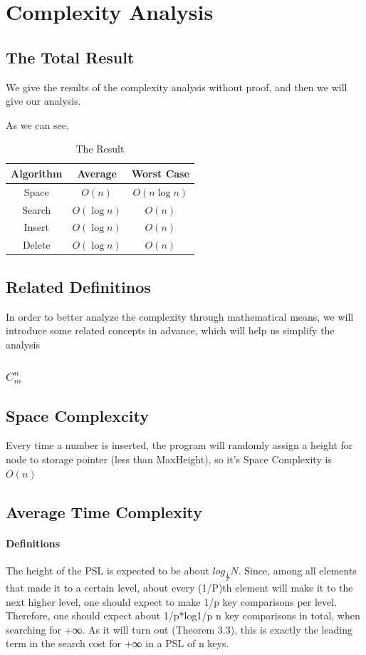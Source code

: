 \documentclass[10pt,english, openany]{book}
\begin{document}
\chapter{Complexity Analysis}
\section{The Total Result}
We give the results of the complexity analysis without proof, and then we will give our analysis.

As we can see, 
\begin{table}[h]
\centering
\begin{tabular}{ccc}
\textbf{Algorithm} & \textbf{Average} & \textbf{Worst Case} \\
\hline
Space & $O(n)$ & $O(n\log n)$ \\
\hline
Search & $O(\log n)$ & $O(n)$\\
\hline
Insert & $O(\log n)$ & $O(n)$ \\ 
\hline
Delete & $O(\log n)$ & $O(n)$ \\
\hline
\end{tabular}
\caption{The Result}
\end{table}
\section{Related Definitinos}
In order to better analyze the complexity through mathematical means, we will introduce some related concepts in advance, which will help us simplify the analysis
\subsection{$C_m^n$}
\section{Space Complexcity}
Every time a number is inserted, the program will randomly assign a height for node to storage pointer (less than MaxHeight), so it’s Space Complexity is $O(n)$
\section{Average Time Complexity}
\subsubsection{Definitions}
The height of the PSL is expected to be about $log_{\frac{1}{P}}N$. Since, among all elements that made it to a certain level, about every (1/P)th element will make it to the next higher level, one should expect to make 1/p key comparisons per level. Therefore, one should expect about 1/p*log1/p n key comparisons in total, when searching for +∞. As it will turn out (Theorem 3.3), this is exactly the leading term in the search cost for +∞ in a PSL of n keys.
\end{document}
